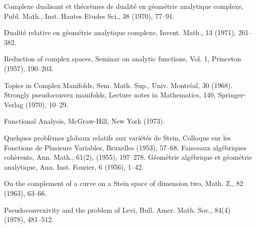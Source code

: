 \begin{sourcebibliography}
 Complexe dualisant et th\'eor\`emes de dualit\'e en g\'eom\'etrie analytique complexe, Publ. Math., Inst. Hautes Etudes Sci., 38 (1970), 77--91.
\end{sourcebibliography}
\begin{sourcebibliography}
 Dualit\'e relative en g\'eom\'etrie analytique complexe, Invent. Math., 13 (1971), 261--382.
\end{sourcebibliography}
\begin{sourcebibliography}
 Reduction of complex spaces, Seminar on analytic functions, Vol. 1, Princeton (1957), 190--203.
\end{sourcebibliography}
\begin{sourcebibliography}
 Topics in Complex Manifolds, Sem. Math. Sup., Univ. Montr\'eal, 30 (1968).
 Strongly pseudoconvex manifolds, Lecture notes in Mathematics, 140, Springer-Verlag (1970), 10--29.
\end{sourcebibliography}
\begin{sourcebibliography}
 Functional Analysis, McGraw-Hill, New York (1973).
\end{sourcebibliography}
\begin{sourcebibliography}
 Quelques probl\`emes globaux relatifs aux vari\'et\'es de Stein, Colloque sur les Fonctions de Plusieurs Variables, Bruxelles (1953), 57--68.
 Faisceaux alg\'ebriques coh\`erents, Ann. Math., 61(2), (1955), 197--278.
 G\'eom\'etrie alg\'ebrique et g\'eom\'etrie analytique, Ann. Inst. Fourier, 6 (1956), 1--42.
\end{sourcebibliography}
\begin{sourcebibliography}
 On the complement of a curve on a Stein space of dimension two, Math. Z., 82 (1963), 63--66.
\end{sourcebibliography}
\begin{sourcebibliography}
 Pseudoconvexivity and the problem of Levi, Bull. Amer. Math. Soc., 84(4) (1978), 481--512.
\end{sourcebibliography}
